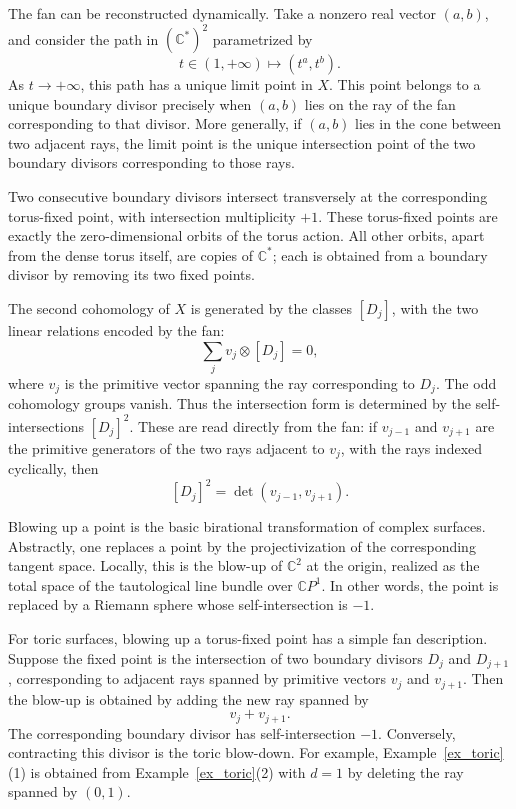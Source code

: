 \documentclass[a4paper,american,11pt]{amsart}
\theoremstyle{plain}
\theoremstyle{definition}
\newcommand{\C}{\mathbb C}
\begin{document}
The fan can be reconstructed dynamically.  Take a nonzero real vector
\((a,b)\), and consider the path in \((\C^*)^2\) parametrized by
\[
t\in(1,+\infty)\longmapsto (t^a,t^b).
\]
As \(t\to+\infty\), this path has a unique limit point in \(X\).  This point
belongs to a unique boundary divisor precisely when \((a,b)\) lies on the
ray of the fan corresponding to that divisor.  More generally, if \((a,b)\)
lies in the cone between two adjacent rays, the limit point is the unique
intersection point of the two boundary divisors corresponding to those rays.

Two consecutive boundary divisors intersect transversely at the corresponding
torus-fixed point, with intersection multiplicity \(+1\).  These torus-fixed
points are exactly the zero-dimensional orbits of the torus action.  All
other orbits, apart from the dense torus itself, are copies of \(\C^*\); each
is obtained from a boundary divisor by removing its two fixed points.

The second cohomology of \(X\) is generated by the classes \([D_j]\), with
the two linear relations encoded by the fan:
\[
\sum_j v_j\otimes [D_j]=0,
\]
where \(v_j\) is the primitive vector spanning the ray corresponding to
\(D_j\).  The odd cohomology groups vanish.  Thus the intersection form is
determined by the self-intersections \([D_j]^2\).  These are read directly
from the fan: if \(v_{j-1}\) and \(v_{j+1}\) are the primitive generators of
the two rays adjacent to \(v_j\), with the rays indexed cyclically, then
\[
[D_j]^2=\det(v_{j-1},v_{j+1}).
\]

Blowing up a point is the basic birational transformation of complex
surfaces.  Abstractly, one replaces a point by the projectivization of the
corresponding tangent space.  Locally, this is the blow-up of \(\C^2\) at the
origin, realized as the total space of the tautological line bundle over
\(\C P^1\).  In other words, the point is replaced by a Riemann sphere whose
self-intersection is \(-1\).

For toric surfaces, blowing up a torus-fixed point has a simple fan
description.  Suppose the fixed point is the intersection of two boundary
divisors \(D_j\) and \(D_{j+1}\), corresponding to adjacent rays spanned by
primitive vectors \(v_j\) and \(v_{j+1}\).  Then the blow-up is obtained by
adding the new ray spanned by
\[
v_j+v_{j+1}.
\]
The corresponding boundary divisor has self-intersection \(-1\).  Conversely,
contracting this divisor is the toric blow-down.  For example,
Example~\ref{ex_toric}(1) is obtained from Example~\ref{ex_toric}(2) with
\(d=1\) by deleting the ray spanned by \((0,1)\).
\end{document}
